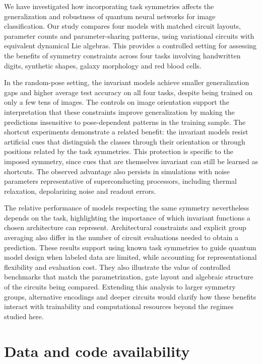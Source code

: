 \documentclass[aps,pra,reprint,superscriptaddress,longbibliography]{revtex4-2}
\begin{document}
We have investigated how incorporating task symmetries affects the
generalization and robustness of quantum neural networks for image
classification. Our study compares four models with matched circuit
layouts, parameter counts and parameter-sharing patterns, using
variational circuits with equivalent dynamical Lie algebras.
This provides a controlled setting for assessing the benefits of
symmetry constraints across four tasks involving handwritten digits,
synthetic shapes, galaxy morphology and red blood cells.

In the random-pose setting, the invariant models achieve smaller
generalization gaps and higher average test accuracy on all four
tasks, despite being trained on only a few tens of images.
The controls on image orientation support the interpretation that
these constraints improve generalization by making the predictions
insensitive to pose-dependent patterns in the training sample.
The shortcut experiments demonstrate a related benefit: the invariant
models resist artificial cues that distinguish the classes through
their orientation or through positions related by the task symmetries.
This protection is specific to the imposed symmetry, since cues that
are themselves invariant can still be learned as shortcuts.
The observed advantage also persists in simulations with noise
parameters representative of superconducting processors, including
thermal relaxation, depolarizing noise and readout errors.

The relative performance of models respecting the same symmetry
nevertheless depends on the task, highlighting the importance of
which invariant functions a chosen architecture can represent.
Architectural constraints and explicit group averaging also differ
in the number of circuit evaluations needed to obtain a prediction.
These results support using known task symmetries to guide quantum
model design when labeled data are limited, while accounting for
representational flexibility and evaluation cost.
They also illustrate the value of controlled benchmarks that match
the parametrization, gate layout and algebraic structure of the
circuits being compared.
Extending this analysis to larger symmetry groups, alternative
encodings and deeper circuits would clarify how these benefits
interact with trainability and computational resources beyond the
regimes studied here.

\section*{Data and code availability}
\end{document}
